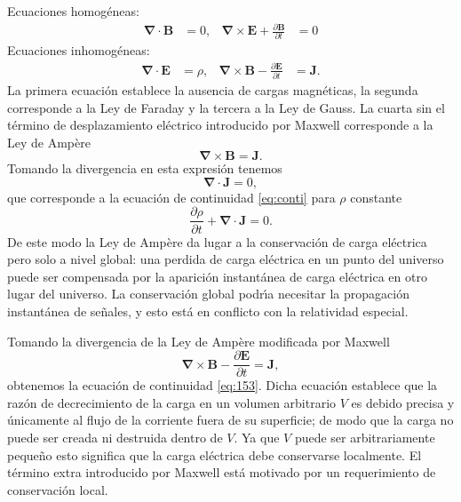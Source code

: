 Ecuaciones homog\'eneas:
\begin{align}
  \label{eq:hom_m_eq}
  \boldsymbol{\nabla}\cdot\mathbf{B}&=0,&\boldsymbol{\nabla}\times\mathbf{E}+\frac{\partial\mathbf{B}}{\partial t}&=0
\end{align}
Ecuaciones inhomog\'eneas:
\begin{align}
  \label{eq:inhom_m_eq}
  \boldsymbol{\nabla}\cdot\mathbf{E}&=\rho,&\boldsymbol{\nabla}\times\mathbf{B}-\frac{\partial\mathbf{E}}{\partial t}&=\mathbf{J}.
\end{align}
La primera ecuaci\'on establece la ausencia de cargas magn\'eticas, la segunda corresponde a la Ley de Faraday y la tercera a la Ley de Gauss. La cuarta sin el t\'ermino de desplazamiento el\'ectrico introducido por Maxwell corresponde a la Ley de Amp\`ere
\begin{equation}
   \boldsymbol{\nabla}\times\mathbf{B}=\mathbf{J}.
\end{equation}
Tomando la divergencia en esta expresi\'on tenemos
\begin{equation}
  \boldsymbol{\nabla}\cdot\mathbf{J}=0,
\end{equation}
que corresponde a la ecuaci\'on de continuidad \eqref{eq:conti} para $\rho$ constante
\begin{equation}
  \label{eq:153}
  \frac{\partial \rho}{\partial t}+\boldsymbol{\nabla}\cdot\mathbf{J}=0.
\end{equation}
De este modo la Ley de Amp\`ere da lugar a la conservaci\'on de carga el\'ectrica pero solo a nivel global:  una perdida de carga el\'ectrica en un punto del universo puede ser compensada por la aparici\'on instant\'anea de carga el\'ectrica en otro lugar del universo. La conservaci\'on global podr\'\i a necesitar la propagaci\'on instant\'anea de se\~nales, y esto est\'a en conflicto con la relatividad especial.


Tomando la divergencia de la Ley de Amp\`ere modificada por Maxwell
\begin{equation}
   \boldsymbol{\nabla}\times\mathbf{B}-\frac{\partial\mathbf{E}}{\partial t}=\mathbf{J},
\end{equation}
obtenemos la ecuaci\'on de continuidad \eqref{eq:153}. Dicha ecuaci\'on establece que la raz\'on de decrecimiento de la carga en un volumen arbitrario $V$ es debido precisa y \'unicamente al flujo de la corriente fuera de su superficie; de modo que la carga no puede ser creada ni destruida dentro de $V$.  Ya que $V$ puede ser arbitrariamente peque\~no esto significa que la carga el\'ectrica debe conservarse localmente.   El t\'ermino extra introducido por Maxwell est\'a motivado por un requerimiento de conservaci\'on local. 

